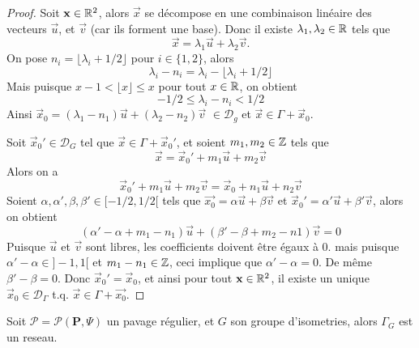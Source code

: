 \begin{proof}
	Soit $\mathbf{x} \in \mathbb{R}^2$, alors $\vec{x}$ se décompose en une combinaison
	linéaire des vecteurs $\vec{u}$, et $\vec{v}$ (car ils forment une base).
	Donc il existe $\lambda_1, \lambda_2 \in \mathbb{R}$ tels que
	\begin{equation*}
		\vec{x} = \lambda_1 \vec{u} + \lambda_2 \vec{v}.
	\end{equation*}
	On pose $n_i = \lfloor \lambda_i + 1/2 \rfloor$ pour $i \in \{1, 2\}$, alors 
	\begin{equation*}
		\lambda_i - n_i = \lambda_i - \lfloor \lambda_i + 1/2 \rfloor
	\end{equation*}
	Mais puisque $x - 1 < \lfloor x \rfloor \leq x$ pour tout $x \in \mathbb{R}$, on
	obtient
	\begin{equation*}
		-1/2 \leq \lambda_i - n_i < 1/2	
	\end{equation*}
	Ainsi $\vec{x}_0 = (\lambda_1 - n_1)\vec{u} + (\lambda_2 - n_2)\vec{v}$
	$\in \mathcal{D}_g$ et $\vec{x} \in \Gamma + \vec{x}_0$.

	Soit $\vec{x}_0' \in \mathcal{D}_G$ tel que $\vec{x} \in \Gamma + \vec{x}_0'$,
	et soient $m_1, m_2 \in \mathbb{Z}$ tels que
	\begin{equation*}
		\vec{x} = \vec{x}_0' + m_1\vec{u} + m_2\vec{v}
	\end{equation*}
	Alors on a
	\begin{equation*}
		\vec{x}_0' + m_1\vec{u} + m_2\vec{v} = \vec{x}_0 + n_1\vec{u} + n_2\vec{v}
	\end{equation*}
	Soient $\alpha, \alpha', \beta, \beta' \in [-1/2, 1/2[$ tels que
	$\vec{x_0} = \alpha\vec{u} + \beta\vec{v}$ et
	$\vec{x}_0' = \alpha'\vec{u} + \beta'\vec{v}$, alors on obtient
	\begin{equation*}
		(\alpha' - \alpha + m_1 - n_1)\vec{u} + (\beta'-\beta + m_2 - n1)\vec{v} = 0
	\end{equation*}
	Puisque $\vec{u}$ et $\vec{v}$ sont libres, les coefficients doivent être
	égaux à 0. mais puisque $\alpha' - \alpha \in ]-1, 1[$ et $m_1 - n_1 \in \mathbb{Z}$,
	ceci implique que $\alpha' - \alpha = 0$. De même $\beta' - \beta = 0$.
	Donc $\vec{x}_0' = \vec{x}_0$, et ainsi pour tout $\mathbf{x} \in \mathbb{R}^2$,
	il existe un unique $\vec{x}_0 \in \mathcal{D}_\Gamma$ t.q.
	$\vec{x} \in \Gamma + \vec{x_0}$.
\end{proof}

\begin{theorem}
	Soit $\mathcal{P} = \mathcal{P}(\mathbf{P}, \Psi)$ un pavage régulier, et
	$G$ son groupe d'isometries, alors $\Gamma_G$ est un reseau.
\end{theorem}

